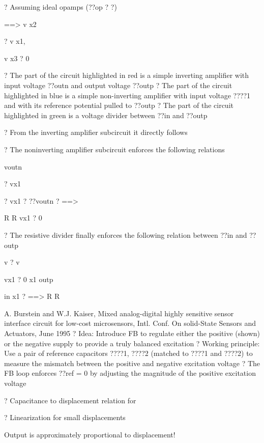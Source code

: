 \documentclass[2pt,landscape]{article}
\begin{document}
\begin{multicols*}{5}
?	Assuming ideal opamps (??op ? ?)


==> v x2


? v x1,


v x3 ? 0



?	The part of the circuit highlighted in 
red is a simple inverting amplifier 
with input voltage ??outn and output 
voltage ??outp
?	The part of the circuit highlighted in 
blue is a simple non-inverting 
amplifier with input voltage ????1 and 
with its reference potential pulled to
??outp
?	The part of the circuit highlighted in 
green is a voltage divider between
??in and ??outp



?	From the inverting amplifier subcircuit it 
directly follows


?	The noninverting amplifier subcircuit 
enforces the following relations



voutn


?	vx1


? vx1 ? ??voutn ? ==>


R	R
vx1 ? 0


?	The resistive divider finally enforces the 
following relation between ??in and ??outp


v	? v


vx1 ? 
0
x1	outp


in	x1 ?	==>
R	R





A. Burstein and W.J. Kaiser, \textbullet Mixed analog-digital highly sensitive sensor interface circuit for low-cost 
microsensors\textbullet , Intl. Conf. On solid-State Sensors and Actuators, June 1995
?	Idea: Introduce FB to regulate either the positive (shown) or the negative 
supply to provide a truly balanced excitation
?	Working principle: Use a pair of reference capacitors ????1, ????2 (matched to ????1 
and ????2) to measure the mismatch between the positive and negative 
excitation voltage
?	The FB loop enforces ??ref = 0 by adjusting the magnitude of the positive 
excitation voltage




?	Capacitance to displacement relation for

?	Linearization for small displacements

Output is approximately 
proportional to displacement!























\end{multicols*}
\end{document}
